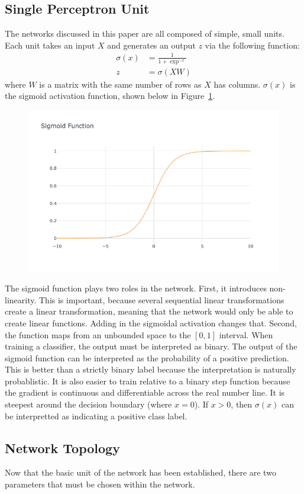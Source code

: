 \documentclass{amsart}
\begin{document}
    \subsection*{Single Perceptron Unit}
    The networks discussed in this paper are all composed of
    simple, small units. Each unit takes an input $X$ and
    generates an output $z$ via the following function:
    \begin{align*}
        \sigma(x) &= \frac{1}{1 + \exp^{-x}} \\
        z &= \sigma(XW)
    \end{align*}
    where $W$ is a matrix with the same number of rows as $X$
    has columns. $\sigma(x)$ is the sigmoid activation function, shown
    below in Figure~\ref{sigmoid}.
    \begin{figure}
        \centering
        \includegraphics[width=.6\textwidth]{sigmoid.png}
        \label{sigmoid}
    \end{figure}
    The sigmoid function plays two roles in the network. First, it
    introduces non-linearity. This is important, because several
    sequential linear transformations create a linear transformation,
    meaning that the network would only be able to create
    linear functions. Adding in the sigmoidal activation
    changes that. Second, the function maps from an unbounded space to
    the $[0, 1]$ interval. When training a classifier, the output
    must be interpreted as binary. The output of the sigmoid
    function can be interpreted as the probability of a positive
    prediction. This is better than a strictly binary label
    because the interpretation is naturally probablistic. It is
    also easier to train relative to a binary step function because
    the gradient is continuous and differentiable across the real
    number line. It is steepest around the decision boundary (where $x = 0$).
    If $x > 0$, then $\sigma(x)$ can be interpretted as indicating a positive class
    label.

    \subsection*{Network Topology}
    Now that the basic unit of the network has been established, there
    are two parameters that must be chosen within the network\cite{deeplearning}.
\end{document}
